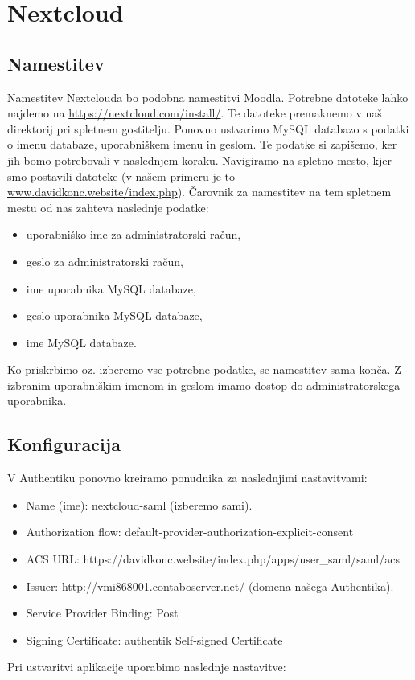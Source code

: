 \documentclass[a4paper,12pt,openright,oneside]{book}
\begin{document}
\section{Nextcloud}
\subsection{Namestitev}
Namestitev Nextclouda bo podobna namestitvi Moodla. Potrebne datoteke lahko najdemo na \href{https://nextcloud.com/install/}{https://nextcloud.com/install/}. Te datoteke premaknemo v naš direktorij pri spletnem gostitelju. Ponovno ustvarimo MySQL databazo s podatki o imenu databaze, uporabniškem imenu in geslom. Te podatke si zapišemo, ker jih bomo potrebovali v naslednjem koraku.
\newline
Navigiramo na spletno mesto, kjer smo postavili datoteke (v našem primeru je to \href{www.davidkonc.website/index.php}{www.davidkonc.website/index.php}). Čarovnik za namestitev na tem spletnem mestu od nas zahteva naslednje podatke:
\begin{itemize}
    \item uporabniško ime za administratorski račun,
    \item geslo za administratorski račun,
    \item ime uporabnika MySQL databaze,
    \item geslo uporabnika MySQL databaze,
    \item ime MySQL databaze.
\end{itemize}

Ko priskrbimo oz. izberemo vse potrebne podatke, se namestitev sama konča. Z izbranim uporabniškim imenom in geslom imamo dostop do administratorskega uporabnika.
\subsection{Konfiguracija}
V Authentiku ponovno kreiramo ponudnika za naslednjimi nastavitvami:
\begin{itemize}
    \item Name (ime): nextcloud-saml (izberemo sami).
    \item Authorization flow: default-provider-authorization-explicit-consent 
    \item ACS URL: https://davidkonc.website/index.php/apps/user\_saml/saml/acs
    \item Issuer: http://vmi868001.contaboserver.net/ (domena našega Authentika).
    \item Service Provider Binding:  Post
    \item Signing Certificate: authentik Self-signed Certificate
\end{itemize}
Pri ustvaritvi aplikacije uporabimo naslednje nastavitve:
\end{document}
